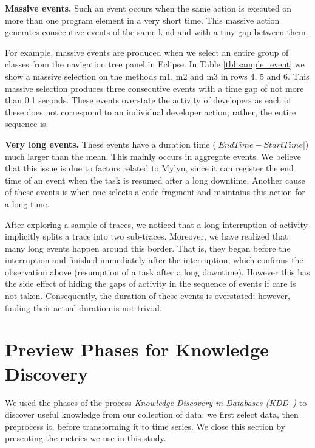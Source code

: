 \documentclass[conference]{IEEEtran}
\begin{document}
\textbf{Massive events. } Such an event occurs when the same action is executed on more than one program element in a very short time. This massive action generates consecutive events of the same kind and with a tiny gap between them.

For example, massive events are produced when we select an entire group of classes from the navigation tree panel in Eclipse. In  Table \ref{tbl:sample_event} we show a massive selection on the methods m1, m2 and m3  in rows 4, 5 and 6. This massive selection produces three consecutive events with a time gap of not more than 0.1 seconds. These events overstate the activity of developers as each of these does not correspond to an individual developer action; rather, the entire sequence is.


\textbf{Very long events. } These events have a duration time ($|EndTime - StartTime|$) much larger than the mean. This mainly occurs in aggregate events. We believe that this issue is due to factors related to Mylyn, since it can register the end time of an event when the task is resumed after a long downtime. Another cause of these events is when one selects a code fragment and maintains this action for a long time. 
 
After exploring a sample of traces, we noticed that a long interruption of activity implicitly splits a trace into two sub-traces.  Moreover,  we have realized that many long events happen around this border. That is, they began before the interruption and finished immediately after the interruption, which confirms the observation above (resumption of a task after a long downtime). However this has the side effect of hiding the gaps of activity in the sequence of events if care is not taken. Consequently, the duration of these events is overstated; however, finding their actual duration is not trivial. 




\section{Preview Phases for Knowledge Discovery}
We used the phases of the process \textit{Knowledge Discovery in Databases (KDD~\cite{FPP96})} to discover useful knowledge from our collection of data: we first select data, then preprocess it, before transforming it to time series. We close this section by presenting the metrics we use in this study. %
\end{document}
